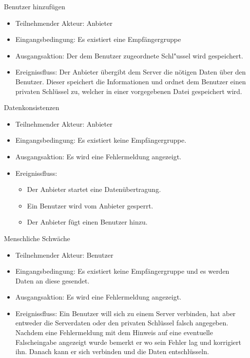 \documentclass[a4paper,10pt]{scrartcl}
\begin{document}
\begin{usecase}

 {Benutzer hinzufügen
   \begin{itemize}
   \item Teilnehmender Akteur: Anbieter
   \item Eingangsbedingung: Es existiert eine Empfängergruppe
   \item Ausgangsaktion: Der dem Benutzer zugeordnete Schl"ussel wird gespeichert.
   \item Ereignissfluss: Der Anbieter übergibt dem Server die nötigen Daten über den Benutzer.
         Dieser speichert die Informationen und ordnet dem Benutzer einen privaten Schlüssel
         zu, welcher in einer vorgegebenen Datei gespeichert wird.
   \end{itemize}
}
 {Datenkonsistenzen
   \begin{itemize}
   \item Teilnehmender Akteur: Anbieter
   \item Eingangsbedingung: Es existiert keine Empfängergruppe.
   \item Ausgangsaktion: Es wird eine Fehlermeldung angezeigt.
   \item Ereignissfluss:
          \begin{itemize}
           \item Der Anbieter startet eine Datenübertragung.
           \item Ein Benutzer wird vom Anbieter gesperrt.
           \item Der Anbieter fügt einen Benutzer hinzu.
           \end{itemize}
   \end{itemize}
}
 {Menschliche Schwäche
   \begin{itemize}
   \item Teilnehmender Akteur: Benutzer
   \item Eingangsbedingung: Es existiert keine Empfängergruppe und es werden Daten an diese gesendet.
   \item Ausgangsaktion: Es wird eine Fehlermeldung angezeigt.
   \item Ereignissfluss: Ein Benutzer will sich zu einem Server verbinden, hat aber entweder die Serverdaten oder den privaten Schlüssel falsch angegeben.
             Nachdem eine Fehlermeldung mit dem Hinweis auf eine eventuelle Falscheingabe angezeigt wurde bemerkt er wo sein Fehler lag und korrigiert ihn.
            Danach kann er sich verbinden und die Daten entschlüsseln.
   \end{itemize}
}
\end{usecase}
\end{document}
